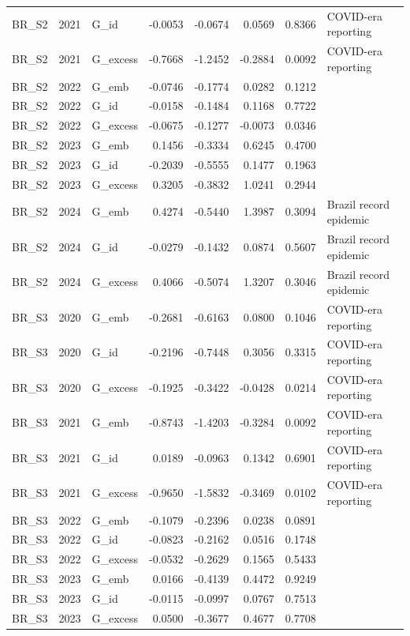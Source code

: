 \begin{tabular}{lllrrrrl}
BR\_S2 & 2021 & G\_id & -0.0053 & -0.0674 & 0.0569 & 0.8366 & COVID-era reporting \\
BR\_S2 & 2021 & G\_excess & -0.7668 & -1.2452 & -0.2884 & 0.0092 & COVID-era reporting \\
BR\_S2 & 2022 & G\_emb & -0.0746 & -0.1774 & 0.0282 & 0.1212 &  \\
BR\_S2 & 2022 & G\_id & -0.0158 & -0.1484 & 0.1168 & 0.7722 &  \\
BR\_S2 & 2022 & G\_excess & -0.0675 & -0.1277 & -0.0073 & 0.0346 &  \\
BR\_S2 & 2023 & G\_emb & 0.1456 & -0.3334 & 0.6245 & 0.4700 &  \\
BR\_S2 & 2023 & G\_id & -0.2039 & -0.5555 & 0.1477 & 0.1963 &  \\
BR\_S2 & 2023 & G\_excess & 0.3205 & -0.3832 & 1.0241 & 0.2944 &  \\
BR\_S2 & 2024 & G\_emb & 0.4274 & -0.5440 & 1.3987 & 0.3094 & Brazil record epidemic \\
BR\_S2 & 2024 & G\_id & -0.0279 & -0.1432 & 0.0874 & 0.5607 & Brazil record epidemic \\
BR\_S2 & 2024 & G\_excess & 0.4066 & -0.5074 & 1.3207 & 0.3046 & Brazil record epidemic \\
BR\_S3 & 2020 & G\_emb & -0.2681 & -0.6163 & 0.0800 & 0.1046 & COVID-era reporting \\
BR\_S3 & 2020 & G\_id & -0.2196 & -0.7448 & 0.3056 & 0.3315 & COVID-era reporting \\
BR\_S3 & 2020 & G\_excess & -0.1925 & -0.3422 & -0.0428 & 0.0214 & COVID-era reporting \\
BR\_S3 & 2021 & G\_emb & -0.8743 & -1.4203 & -0.3284 & 0.0092 & COVID-era reporting \\
BR\_S3 & 2021 & G\_id & 0.0189 & -0.0963 & 0.1342 & 0.6901 & COVID-era reporting \\
BR\_S3 & 2021 & G\_excess & -0.9650 & -1.5832 & -0.3469 & 0.0102 & COVID-era reporting \\
BR\_S3 & 2022 & G\_emb & -0.1079 & -0.2396 & 0.0238 & 0.0891 &  \\
BR\_S3 & 2022 & G\_id & -0.0823 & -0.2162 & 0.0516 & 0.1748 &  \\
BR\_S3 & 2022 & G\_excess & -0.0532 & -0.2629 & 0.1565 & 0.5433 &  \\
BR\_S3 & 2023 & G\_emb & 0.0166 & -0.4139 & 0.4472 & 0.9249 &  \\
BR\_S3 & 2023 & G\_id & -0.0115 & -0.0997 & 0.0767 & 0.7513 &  \\
BR\_S3 & 2023 & G\_excess & 0.0500 & -0.3677 & 0.4677 & 0.7708 &  \\

\end{tabular}
